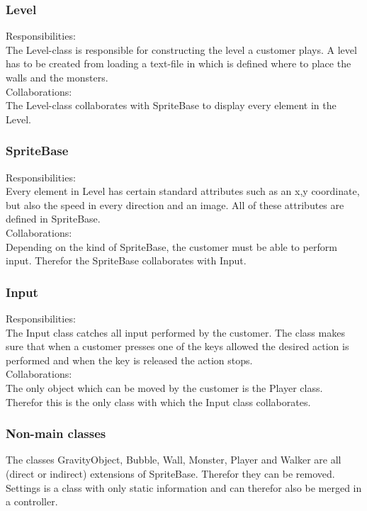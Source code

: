 \subsubsection{Level}
Responsibilities: \\
The Level-class is responsible for constructing the level a customer plays. A level has to be created from loading a text-file in which is defined where to place the walls and the monsters. \\
Collaborations: \\
The Level-class collaborates with SpriteBase to display every element in the Level.  

\subsubsection{SpriteBase}
Responsibilities: \\
Every element in Level has certain standard attributes such as an x,y coordinate, but also the speed in every direction and an image. All of these attributes are defined in SpriteBase. \\
Collaborations: \\
Depending on the kind of SpriteBase, the customer must be able to perform input. Therefor the SpriteBase collaborates with Input. 

\subsubsection{Input}
Responsibilities: \\
The Input class catches all input performed by the customer. The class makes sure that when a customer presses one of the keys allowed the desired action is performed and when the key is released the action stops. \\
Collaborations: \\
The only object which can be moved by the customer is the Player class. Therefor this is the only class with which the Input class collaborates. 

\subsubsection{Non-main classes}
The classes GravityObject, Bubble, Wall, Monster, Player and Walker are all (direct or indirect) extensions of SpriteBase. Therefor they can be removed. Settings is a class with only static information and can therefor also be merged in a controller. 